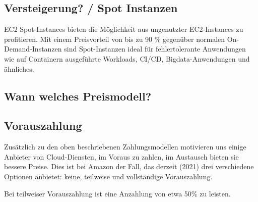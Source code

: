 
\subsection{Versteigerung? / Spot Instanzen }
EC2 Spot-Instances bieten die Möglichkeit aus ungenutzter EC2-Instances zu profitieren. 
Mit einem Preisvorteil von bis zu 90 \% gegenüber normalen On-Demand-Instanzen sind Spot-Instanzen ideal für fehlertolerante Anwendungen wie auf Containern ausgeführte Workloads, CI/CD, Bigdata-Anwendungen und ähnliches.

\subsection{Wann welches Preismodell?}



\subsection{Vorauszahlung}
Zusätzlich zu den oben beschriebenen Zahlungsmodellen motivieren uns einige Anbieter von Cloud-Diensten, im Voraus zu zahlen, im Austausch bieten sie bessere Preise. Dies ist bei Amazon der Fall, das derzeit (2021) drei verschiedene Optionen anbietet: keine, teilweise und vollständige Vorauszahlung.

Bei teilweiser Vorauszahlung ist eine Anzahlung von etwa 50\% zu leisten.
